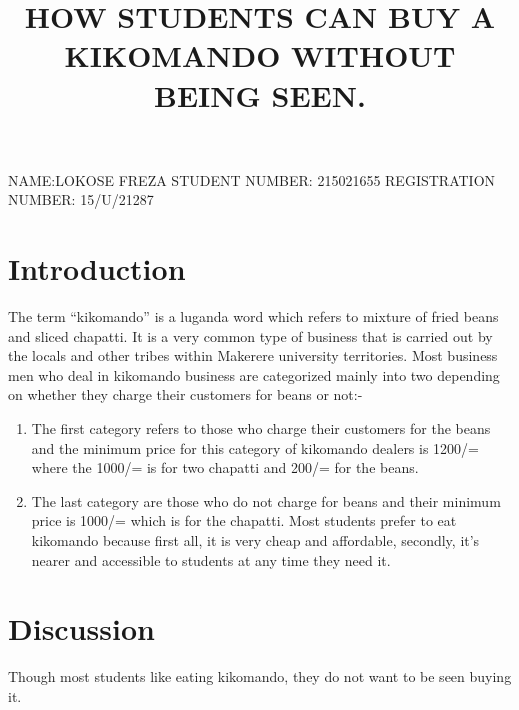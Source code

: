 \documentclass[12pt,a4paper]{article}
\title{HOW STUDENTS CAN BUY A KIKOMANDO WITHOUT BEING SEEN.}
\begin{document}
	NAME:LOKOSE FREZA
		\newline
	STUDENT NUMBER: 215021655
	\newline
	REGISTRATION NUMBER: 15/U/21287
	\newline
	\tableofcontents
	
	
	
	\section{Introduction}
	The term “kikomando” is a luganda word which refers to mixture of fried beans and sliced chapatti.
	It is a very common type of business that is carried out by the locals and other tribes within Makerere university territories.
	Most business men who deal in kikomando business are categorized mainly into two depending on whether they charge their customers for beans or not:-
	\begin{enumerate}
	\item 
		The first category refers to those who charge their customers for the beans and the minimum price for this category of kikomando dealers is 1200/= where the 1000/= is for two chapatti and 200/= for the beans.
    
    
		
    \item
    	The last category are those who do not charge for beans and their minimum price is 1000/= which is for the chapatti.
	    Most students prefer to eat kikomando because first all, it is very cheap and affordable, secondly, it’s nearer and accessible to students at any time they need it. 
	  
	 \end{enumerate}	
	 
	\section{Discussion}
	Though most students like eating kikomando, they do not want to be seen buying it.
	
\end{document}
